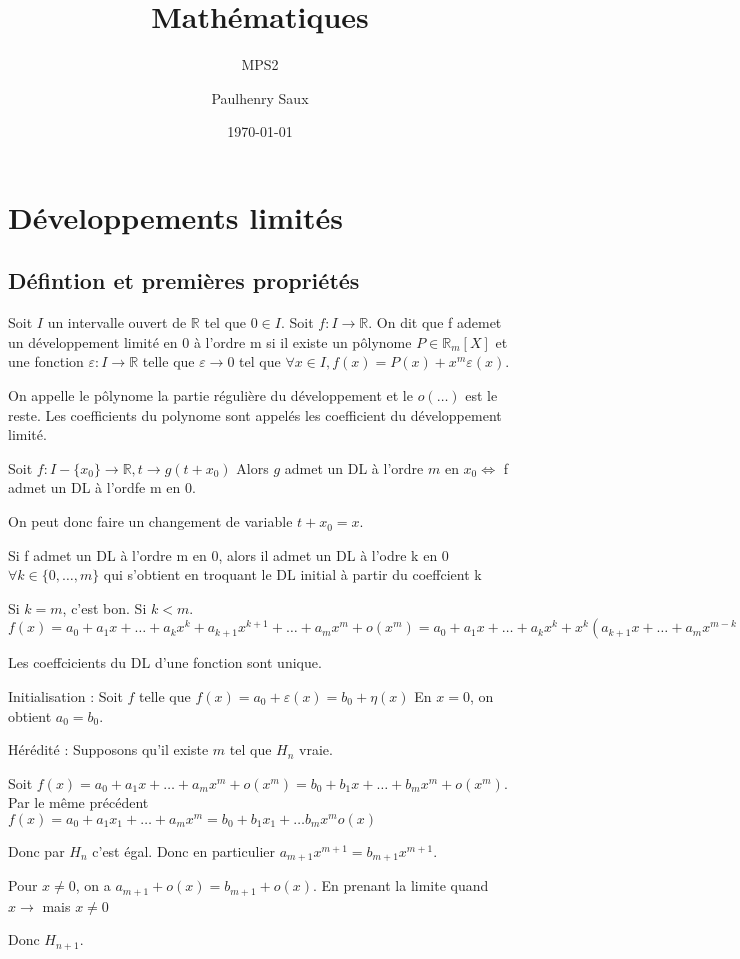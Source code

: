 \documentclass[french]{yLectureNote}
\title{Mathématiques}
\subtitle{MPS2}
\author{Paulhenry Saux}
\date{\today}
\newcommand{\R}[0]{\mathbb{R}}
\begin{document}

	\chapter{Développements limités}
\section{Défintion et premières propriétés}
\begin{definition}
Soit $I$ un intervalle ouvert de \(\R\) tel que \(0\in I\). Soit \(f:I\to \R\). On dit que f ademet un développement limité en 0 à l'ordre m si il existe un p\^olynome \(P\in\R_m[X]\) et une fonction \(\varepsilon : I\to \R\) telle que \(\varepsilon \to 0\) tel que \(\forall x\in I, f(x) = P(x) + x^m\varepsilon(x)\).
\end{definition}
On appelle le p\^olynome la partie régulière du développement et le \(o(\dots)\) est le reste. Les coefficients du polynome sont appelés les coefficient du développement limité.
\begin{definition}[En $x\neq 0$]
Soit \(f : I-\{x_0\} \to \R, t\to g(t+x_0)\) Alors \(g\) admet un DL à l'ordre $m$ en $x_0 \iff$ f admet un DL à l'ordfe m en 0.
\end{definition}
On peut donc faire un changement de variable $t+x_0 = x$.
\begin{lemma}
Si f admet un DL à l'ordre m en 0, alors il admet un DL à l'odre k en 0 \(\forall k \in \{0,\dots,m\}\) qui s'obtient en troquant le DL initial à partir du coeffcient k
\end{lemma}
\begin{myproof}
Si $k=m$, c'est bon. Si $k<m$. $f(x) = a_0+a_1x+\dots + a_kx^k + a_{k+1}x^{k+1} + \dots  + a_mx^m +o(x^m) = a_0+a_1x+\dots+a_kx^k + x^k(a_{k+1}x+\dots+a_mx^{m-k} + o(x^{m-k}))$
\end{myproof}
\begin{theorem}[Unicité du DL]
 Les coeffcicients du DL d'une fonction sont unique.
\end{theorem}
\begin{myproof}
Initialisation : Soit $f$ telle que $f(x) = a_0+\varepsilon(x) = b_0+\eta(x)$ En $x=0$, on obtient $a_0=b_0$.

Hérédité : Supposons qu'il existe $m$ tel que $H_n$ vraie.

Soit $f(x) = a_0+a_1x+\dots + a_mx^m + o(x^m) = b_0+b_1x+\dots + b_mx^m + o(x^m)$. Par le m\^eme précédent $f(x) = a_0+a_1x_1+\dots +a_mx^m = b_0+b_1x_1+\dots b_mx^m o(x)$

Donc par $H_n$ c'est égal. Donc en particulier $a_{m+1}x^{m+1} = b_{m+1}x^{m+1}$.

Pour $x\neq 0$, on a $a_{m+1}+o(x) =b_{m+1}+o(x)$. En prenant la limite quand $x\to$ mais $x\neq 0$

Donc $H_{n+1}$.
\end{myproof}
\end{document}
